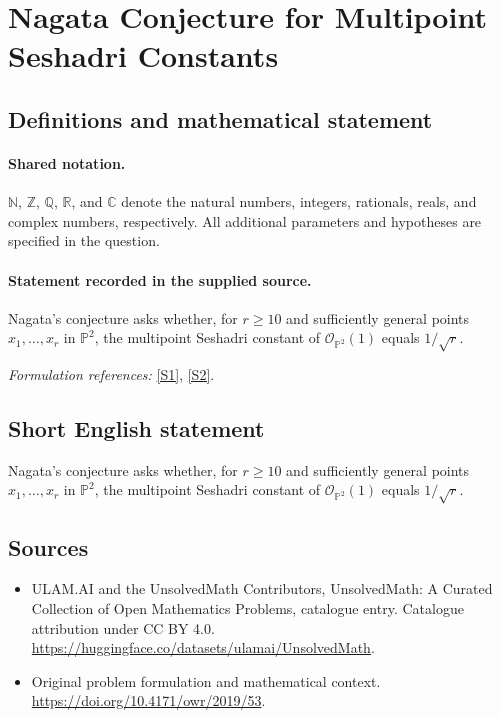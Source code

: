 \documentclass[11pt]{article}
\newcommand{\sref}[2]{\hyperlink{source:#1:#2}{[S#2]}}
\begin{document}
\section{Nagata Conjecture for Multipoint Seshadri Constants}\label{statement}

\subsection{Definitions and mathematical statement}

\paragraph{Shared notation.}$\mathbb N$, $\mathbb Z$, $\mathbb Q$, $\mathbb R$, and $\mathbb C$ denote the natural numbers, integers, rationals, reals, and complex numbers, respectively. All additional parameters and hypotheses are specified in the question.


\paragraph{Statement recorded in the supplied source.}
Nagata's conjecture asks whether, for $r\geq 10$ and sufficiently general points $x_1,\ldots,x_r$ in $\mathbb{P}^2$, the multipoint Seshadri constant of $\mathcal{O}_{\mathbb{P}^2}(1)$ equals $1/\sqrt r$.
\par\smallskip\textit{Formulation references:} \sref{statement}{1}, \sref{statement}{2}.
\subsection{Short English statement}
Nagata's conjecture asks whether, for $r\geq 10$ and sufficiently general points $x_1,\ldots,x_r$ in $\mathbb{P}^2$, the multipoint Seshadri constant of $\mathcal{O}_{\mathbb{P}^2}(1)$ equals $1/\sqrt r$.
\subsection{Sources}
\begin{itemize}
\item[\hypertarget{source:statement:1}{S1}] ULAM.AI and the UnsolvedMath Contributors, UnsolvedMath: A Curated Collection of Open Mathematics Problems, catalogue entry. Catalogue attribution under CC BY 4.0.
\url{https://huggingface.co/datasets/ulamai/UnsolvedMath}.
\item[\hypertarget{source:statement:2}{S2}] Original problem formulation and mathematical context.
\url{https://doi.org/10.4171/owr/2019/53}.
\end{itemize}
\label{end:statement}
\end{document}
